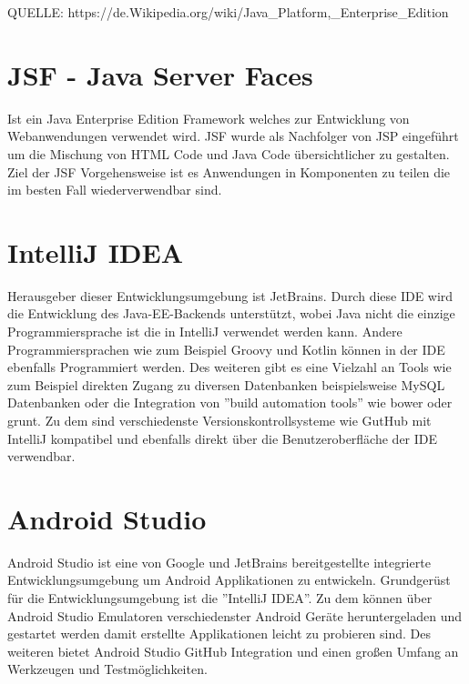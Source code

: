 QUELLE: https://de.Wikipedia.org/wiki/Java_Platform,_Enterprise_Edition

\section{JSF - Java Server Faces}\label{sec:javaee}
Ist ein Java Enterprise Edition Framework welches zur Entwicklung von Webanwendungen verwendet wird. JSF wurde als Nachfolger von JSP eingeführt um die Mischung von HTML Code und Java Code übersichtlicher zu gestalten. Ziel der JSF Vorgehensweise ist es Anwendungen in Komponenten zu teilen die im besten Fall wiederverwendbar sind.

\section{IntelliJ IDEA}
Herausgeber dieser Entwicklungsumgebung ist JetBrains. Durch diese IDE wird die Entwicklung des Java-EE-Backends unterstützt, wobei Java nicht die einzige Programmiersprache ist die in IntelliJ verwendet werden kann. Andere Programmiersprachen wie zum Beispiel Groovy und Kotlin können in der IDE ebenfalls Programmiert werden. Des weiteren gibt es eine Vielzahl an Tools wie zum Beispiel direkten Zugang zu diversen Datenbanken beispielsweise MySQL Datenbanken oder die Integration von ''build automation tools'' wie bower oder grunt. Zu dem sind verschiedenste Versionskontrollsysteme wie GutHub mit IntelliJ kompatibel und ebenfalls direkt über die Benutzeroberfläche der IDE verwendbar.
\section{Android Studio}
Android Studio ist eine von Google und JetBrains bereitgestellte integrierte Entwicklungsumgebung um Android Applikationen zu entwickeln. Grundgerüst für die Entwicklungsumgebung ist die ''IntelliJ IDEA''. Zu dem können über Android Studio Emulatoren verschiedenster Android Geräte heruntergeladen und gestartet werden damit erstellte Applikationen leicht zu probieren sind. Des weiteren bietet Android Studio GitHub Integration und einen großen Umfang an Werkzeugen und Testmöglichkeiten.
  